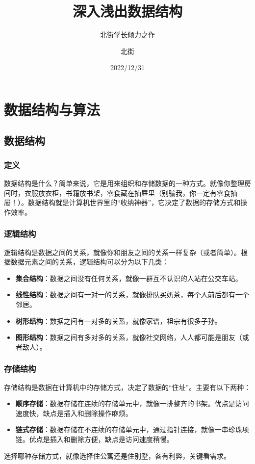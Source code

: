 \documentclass[lang=cn,newtx,10pt,scheme=chinese]{elegantbook}
\title{深入浅出数据结构}
\subtitle{北街学长倾力之作}
\author{北街}
\date{2022/12/31}
\begin{document}
\maketitle
\frontmatter

\tableofcontents

\mainmatter

\chapter{数据结构与算法}

\section{数据结构}

\subsection{定义}
数据结构是什么？简单来说，它是用来组织和存储数据的一种方式。就像你整理房间时，衣服放衣柜，书籍放书架，零食藏在抽屉里（别骗我，你一定有零食抽屉！）。数据结构就是计算机世界里的“收纳神器”，它决定了数据的存储方式和操作效率。

\subsection{逻辑结构}
逻辑结构是数据之间的关系，就像你和朋友之间的关系一样复杂（或者简单）。根据数据元素之间的关系，逻辑结构可以分为以下几类：
\begin{itemize}
    \item \textbf{集合结构}：数据之间没有任何关系，就像一群互不认识的人站在公交车站。
    \item \textbf{线性结构}：数据之间有一对一的关系，就像排队买奶茶，每个人前后都有一个邻居。
    \item \textbf{树形结构}：数据之间有一对多的关系，就像家谱，祖宗有很多子孙。
    \item \textbf{图形结构}：数据之间有多对多的关系，就像社交网络，人人都可能是朋友（或者敌人）。
\end{itemize}

\subsection{存储结构}
存储结构是数据在计算机中的存储方式，决定了数据的“住址”。主要有以下两种：
\begin{itemize}
    \item \textbf{顺序存储}：数据存储在连续的存储单元中，就像一排整齐的书架。优点是访问速度快，缺点是插入和删除操作麻烦。
    \item \textbf{链式存储}：数据存储在不连续的存储单元中，通过指针连接，就像一串珍珠项链。优点是插入和删除方便，缺点是访问速度稍慢。
\end{itemize}
选择哪种存储方式，就像选择住公寓还是住别墅，各有利弊，关键看需求。
\end{document}
